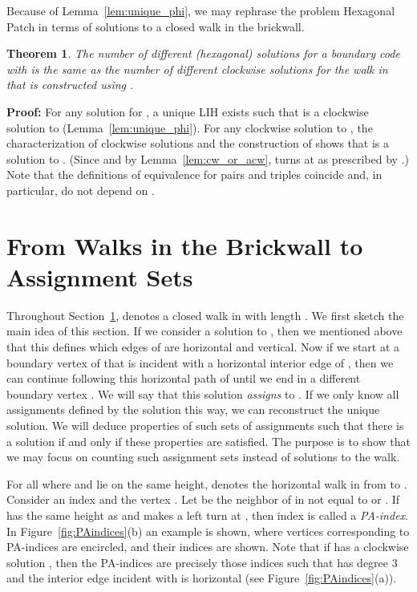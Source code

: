 \documentclass{llncs}
\newcommand{\PF}{{\bf Proof: }}
\newcommand{\QED}{\hspace*{\fill}{}\medskip}
\def\notat#1{{}\marginpar{\raggedright{\small }}}
\def\term#1{{\em #1}\marginpar{\raggedright{\small\it #1}}}
\newtheorem{thm}{Theorem}
\begin{document}
Because of Lemma~\ref{lem:unique_phi}, we may rephrase the problem Hexagonal Patch in terms of solutions  to a closed walk  in the brickwall. 

\begin{thm}
\label{thm:equiv_boundary_walk}
The number of different (hexagonal) solutions for a boundary code  with  is the same as the number of different clockwise solutions for the walk  in  that is constructed using .
\end{thm}
\PF
For any solution  for , a unique LIH  exists such that  is a clockwise solution to  (Lemma~\ref{lem:unique_phi}). For any clockwise solution  to , the characterization of clockwise solutions and the construction of  shows that  is a solution to . 
(Since  and  by Lemma~\ref{lem:cw_or_acw},  turns at  as prescribed by .)
Note that the definitions of equivalence for pairs  and triples  coincide and, in particular, do not depend on .
\QED






\section{From Walks in the Brickwall to Assignment Sets}
\label{sec:assignments}



Throughout Section~\ref{sec:assignments},  denotes a closed walk in  with length .
We first sketch the main idea of this section.
If we consider a solution  to , then we mentioned above that this defines which edges of  are horizontal and vertical. Now if we start at a boundary vertex  of  that is incident with a horizontal interior edge of , then we can continue following this horizontal path of  until we end in a different boundary vertex . We will say that this solution {\em assigns}  to . If we only know all assignments defined by the solution this way, we can reconstruct the unique solution. We will deduce properties of such sets of assignments such that there is a solution if and only if these properties are satisfied. The purpose is to show that we may focus on counting such assignment sets instead of solutions to the walk.



For all  where  and  lie on the same height, \notat{H_{i,j}} denotes the horizontal walk in  from  to .
Consider an index  and the vertex . Let  be the neighbor of  in  not equal to  or . 
If  has the same height as  and  makes a left turn at , then index  is called a \term{PA-index}. 
In Figure~\ref{fig:PAindices}(b) an example 
is shown, where vertices corresponding to PA-indices are encircled, and their indices are shown.
Note that if  has a 
clockwise
solution , then the PA-indices are precisely those indices  such that  has degree 3 and the interior edge incident with  is horizontal (see Figure~\ref{fig:PAindices}(a)).
\end{document}
